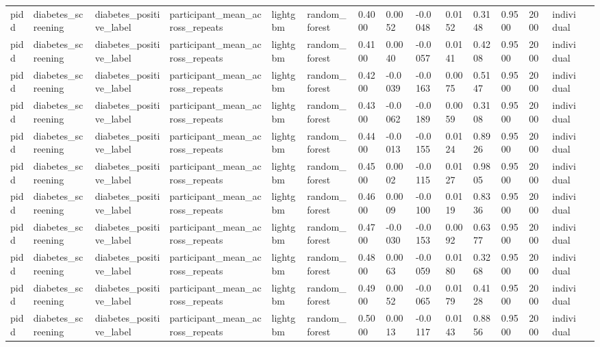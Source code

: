 \begin{tabular}{lllllllllllllll}
pidd & diabetes\_screening & diabetes\_positive\_label & participant\_mean\_across\_repeats & lightgbm & random\_forest & 0.4000 & 0.0052 & -0.0048 & 0.0152 & 0.3148 & 0.9500 & 2000 & individual &  \\
pidd & diabetes\_screening & diabetes\_positive\_label & participant\_mean\_across\_repeats & lightgbm & random\_forest & 0.4100 & 0.0040 & -0.0057 & 0.0141 & 0.4208 & 0.9500 & 2000 & individual &  \\
pidd & diabetes\_screening & diabetes\_positive\_label & participant\_mean\_across\_repeats & lightgbm & random\_forest & 0.4200 & -0.0039 & -0.0163 & 0.0075 & 0.5147 & 0.9500 & 2000 & individual &  \\
pidd & diabetes\_screening & diabetes\_positive\_label & participant\_mean\_across\_repeats & lightgbm & random\_forest & 0.4300 & -0.0062 & -0.0189 & 0.0059 & 0.3108 & 0.9500 & 2000 & individual &  \\
pidd & diabetes\_screening & diabetes\_positive\_label & participant\_mean\_across\_repeats & lightgbm & random\_forest & 0.4400 & -0.0013 & -0.0155 & 0.0124 & 0.8926 & 0.9500 & 2000 & individual &  \\
pidd & diabetes\_screening & diabetes\_positive\_label & participant\_mean\_across\_repeats & lightgbm & random\_forest & 0.4500 & 0.0002 & -0.0115 & 0.0127 & 0.9805 & 0.9500 & 2000 & individual &  \\
pidd & diabetes\_screening & diabetes\_positive\_label & participant\_mean\_across\_repeats & lightgbm & random\_forest & 0.4600 & 0.0009 & -0.0100 & 0.0119 & 0.8336 & 0.9500 & 2000 & individual &  \\
pidd & diabetes\_screening & diabetes\_positive\_label & participant\_mean\_across\_repeats & lightgbm & random\_forest & 0.4700 & -0.0030 & -0.0153 & 0.0092 & 0.6377 & 0.9500 & 2000 & individual &  \\
pidd & diabetes\_screening & diabetes\_positive\_label & participant\_mean\_across\_repeats & lightgbm & random\_forest & 0.4800 & 0.0063 & -0.0059 & 0.0180 & 0.3268 & 0.9500 & 2000 & individual &  \\
pidd & diabetes\_screening & diabetes\_positive\_label & participant\_mean\_across\_repeats & lightgbm & random\_forest & 0.4900 & 0.0052 & -0.0065 & 0.0179 & 0.4128 & 0.9500 & 2000 & individual &  \\
pidd & diabetes\_screening & diabetes\_positive\_label & participant\_mean\_across\_repeats & lightgbm & random\_forest & 0.5000 & 0.0013 & -0.0117 & 0.0143 & 0.8856 & 0.9500 & 2000 & individual &  \\

\end{tabular}
